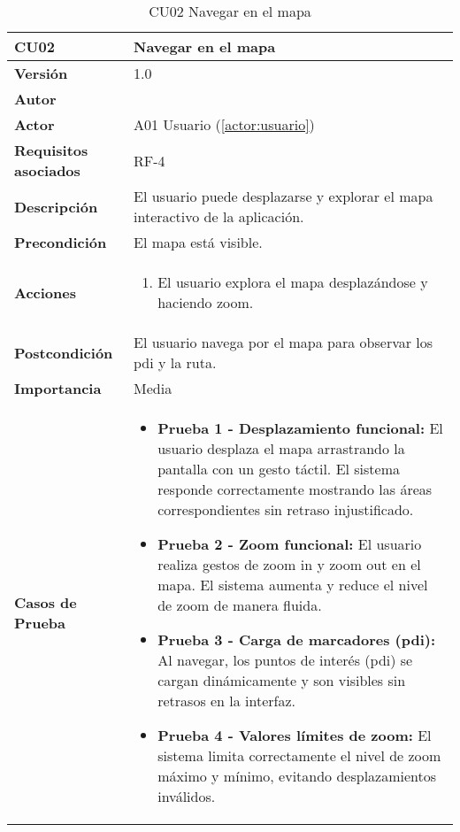 \begin{table}[H]
	\centering
	\begin{tabularx}{\linewidth}{ p{} p{} }
		\toprule
		\textbf{CU02}    & \textbf{Navegar en el mapa} \\
		\toprule
		\textbf{Versión}              & 1.0    \\
		\textbf{Autor}                & \autor \\
		\textbf{Actor}                & A01 Usuario (\ref{actor:usuario}) \\
		\textbf{Requisitos asociados} & RF-4 \\
		\textbf{Descripción}          & El usuario puede desplazarse y explorar el mapa interactivo de la aplicación. \\
		\textbf{Precondición}         & El mapa está visible. \\
		\textbf{Acciones}             &
		\begin{enumerate}
			\def\labelenumi{\arabic{enumi}.}
			\tightlist
			\item El usuario explora el mapa desplazándose y haciendo zoom.
		\end{enumerate}\\
		\textbf{Postcondición}        & El usuario navega por el mapa para observar los \acrshort{pdi} y la ruta. \\
		\textbf{Importancia}          & Media \\
		\textbf{Casos de Prueba}      &
		\begin{itemize}
			\item \textbf{Prueba 1 - Desplazamiento funcional:} El usuario desplaza el mapa arrastrando la pantalla con un gesto táctil. El sistema responde correctamente mostrando las áreas correspondientes sin retraso injustificado.
			\vspace{2pt}
			\item \textbf{Prueba 2 - Zoom funcional:} El usuario realiza gestos de zoom in y zoom out en el mapa. El sistema aumenta y reduce el nivel de zoom de manera fluida.
			\vspace{2pt}
			\item \textbf{Prueba 3 - Carga de marcadores (\acrshort{pdi}):} Al navegar, los puntos de interés (\acrshort{pdi}) se cargan dinámicamente y son visibles sin retrasos en la interfaz.
			\vspace{2pt}
			\item \textbf{Prueba 4 - Valores límites de zoom:} El sistema limita correctamente el nivel de zoom máximo y mínimo, evitando desplazamientos inválidos.
		\end{itemize} \\
		\bottomrule
	\end{tabularx}
	\caption{CU02 Navegar en el mapa}
	\label{cu:navegar-mapa}
\end{table}



